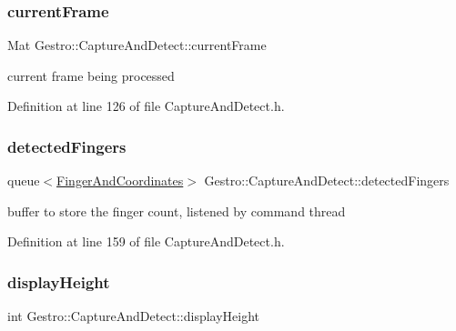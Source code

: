 \subsubsection{\texorpdfstring{current\+Frame}{currentFrame}}
{\footnotesize\ttfamily Mat Gestro\+::\+Capture\+And\+Detect\+::current\+Frame\hspace{0.3cm}{\ttfamily [private]}}



current frame being processed 



Definition at line 126 of file Capture\+And\+Detect.\+h.

\mbox{\label{class_gestro_1_1_capture_and_detect_a7f7e00691a7d60b5de4c481f8c071bf4}} 
\subsubsection{\texorpdfstring{detected\+Fingers}{detectedFingers}}
{\footnotesize\ttfamily queue$<$\hyperlink{class_gesture_detection_1_1_finger_and_coordinates}{Finger\+And\+Coordinates}$>$ Gestro\+::\+Capture\+And\+Detect\+::detected\+Fingers\hspace{0.3cm}{\ttfamily [private]}}



buffer to store the finger count, listened by command thread 



Definition at line 159 of file Capture\+And\+Detect.\+h.

\mbox{\label{class_gestro_1_1_capture_and_detect_ada094d9bbdaddd5eab331ad36939ff1f}} 
\subsubsection{\texorpdfstring{display\+Height}{displayHeight}}
{\footnotesize\ttfamily int Gestro\+::\+Capture\+And\+Detect\+::display\+Height\hspace{0.3cm}{\ttfamily [private]}}



